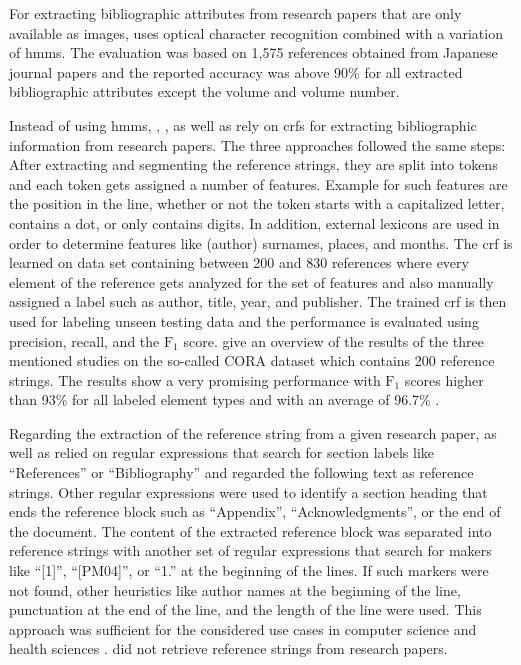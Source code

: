 For extracting bibliographic attributes from research papers that are only available as images, \citet{takasu2003bibliographic} uses optical character recognition combined with a variation of \glspl{hmm}.
The evaluation was based on 1,575 references obtained from Japanese journal papers and the reported accuracy was above 90\% for all extracted bibliographic attributes except the volume and volume number.

Instead of using \glspl{hmm}, \citet{peng2004accurate}, \citet{councill2008parscit}, as well as \citet{groza2012reference} rely on \glspl{crf} for extracting bibliographic information from research papers.
The three approaches followed the same steps:
After extracting and segmenting the reference strings, they are split into tokens and each token gets assigned a number of features.
Example for such features are the position in the line, whether or not the token starts with a capitalized letter, contains a dot, or only contains digits.
In addition, external lexicons are used in order to determine features like (author) surnames, places, and months.
The \gls{crf} is learned on data set containing between 200 and 830 references where every element of the reference gets analyzed for the set of features and also manually assigned a label such as author, title, year, and publisher.
The trained \gls{crf} is then used for labeling unseen testing data and the performance is evaluated using precision, recall, and the $\text{F}_1$ score.
\citet{groza2012reference} give an overview of the results of the three mentioned studies on the so-called CORA dataset which contains 200 reference strings.
The results show a very promising performance with $\text{F}_1$ scores higher than 93\% for all labeled element types and with an average of 96.7\% \citep{groza2012reference}.

Regarding the extraction of the reference string from a given research paper, \citet{councill2008parscit} as well as \citet{groza2012reference} relied on regular expressions that search for section labels like ``References'' or ``Bibliography'' and regarded the following text as reference strings.
Other regular expressions were used to identify a section heading that ends the reference  block such as ``Appendix'', ``Acknowledgments'', or the end of the document.
The content of the extracted reference block was separated into reference strings with another set of regular expressions that search for makers like ``[1]'', ``[PM04]'', or ``1.'' at the beginning of the lines.
If such markers were not found, other heuristics like author names at the beginning of the line, punctuation at the end of the line, and the length of the line were used.
This approach was sufficient for the considered use cases in computer science and health sciences \citep{councill2008parscit,groza2012reference}.
\citet{peng2004accurate} did not retrieve reference strings from research papers.\\

